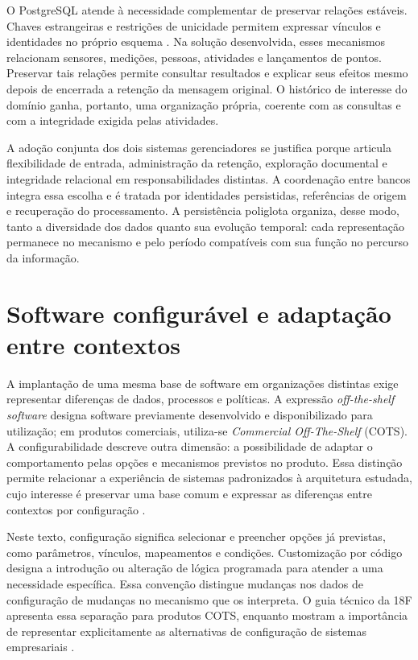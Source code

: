 \documentclass[tcc,capa]{texufpel}
\newif\ifemrevisao
\newcommand{\tintarevisao}{\ifemrevisao\color{correvisao}\fi}
\DeclareRobustCommand{\rev}[1]{{\tintarevisao #1}}
\newcommand{\AP}{\todo[inline, color=yellow!40]}
\begin{document}
O PostgreSQL atende à necessidade complementar de preservar relações estáveis. Chaves estrangeiras e restrições de unicidade permitem expressar vínculos e identidades no próprio esquema \cite{postgresConstraints2026}. Na solução desenvolvida, esses mecanismos relacionam sensores, medições, pessoas, atividades e lançamentos de pontos. Preservar tais relações permite consultar resultados e explicar seus efeitos mesmo depois de encerrada a retenção da mensagem original. O histórico de interesse do domínio ganha, portanto, uma organização própria, coerente com as consultas e com a integridade exigida pelas atividades.

\rev{A adoção conjunta dos dois sistemas gerenciadores se justifica} porque articula flexibilidade de entrada, administração da retenção, exploração documental e integridade relacional em responsabilidades distintas. A coordenação entre bancos integra essa escolha e é tratada por identidades persistidas, referências de origem e recuperação do processamento. A persistência poliglota organiza, desse modo, tanto a diversidade dos dados quanto sua evolução temporal: cada representação permanece no mecanismo e pelo período compatíveis com sua função no percurso da informação.

\AP{dos dois sistemas gerenciadores}

\section{Software configurável e adaptação entre contextos}\label{sec:configurabilidade}
A implantação de uma mesma base de software em organizações distintas exige representar diferenças de dados, processos e políticas. A expressão \emph{off-the-shelf software} designa software previamente desenvolvido e disponibilizado para utilização; em produtos comerciais, utiliza-se \emph{Commercial Off-The-Shelf} (COTS). A configurabilidade descreve outra dimensão: a possibilidade de adaptar o comportamento pelas opções e mecanismos previstos no produto. Essa distinção permite relacionar a experiência de sistemas padronizados à arquitetura estudada, cujo interesse é preservar uma base comum e expressar as diferenças entre contextos por configuração \cite{gsaConfiguracao2026}.

Neste texto, configuração significa selecionar e preencher opções já previstas, como parâmetros, vínculos, mapeamentos e condições. Customização por código designa a introdução ou alteração de lógica programada para atender a uma necessidade específica. Essa convenção distingue mudanças nos dados de configuração de mudanças no mecanismo que os interpreta. O guia técnico da 18F apresenta essa separação para produtos COTS, enquanto \citet{rosemann2007} mostram a importância de representar explicitamente as alternativas de configuração de sistemas empresariais \cite{gsaConfiguracao2026}.
\end{document}
